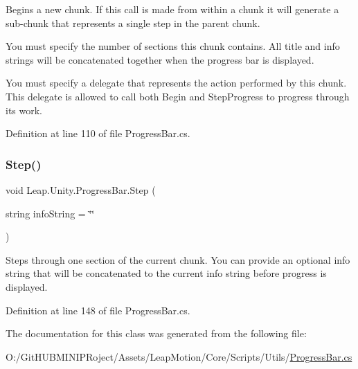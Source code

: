 Begins a new chunk. If this call is made from within a chunk it will generate a sub-\/chunk that represents a single step in the parent chunk. 

You must specify the number of sections this chunk contains. All title and info strings will be concatenated together when the progress bar is displayed.

You must specify a delegate that represents the action performed by this chunk. This delegate is allowed to call both Begin and Step\+Progress to progress through its work. 

Definition at line 110 of file Progress\+Bar.\+cs.

\mbox{\label{class_leap_1_1_unity_1_1_progress_bar_aa59a69d7baf972994660394378c9e3a9}} 
\subsubsection{\texorpdfstring{Step()}{Step()}}
{\footnotesize\ttfamily void Leap.\+Unity.\+Progress\+Bar.\+Step (\begin{DoxyParamCaption}\item[{string}]{info\+String = {\ttfamily \char`\"{}\char`\"{}} }\end{DoxyParamCaption})}



Steps through one section of the current chunk. You can provide an optional info string that will be concatenated to the current info string before progress is displayed. 



Definition at line 148 of file Progress\+Bar.\+cs.



The documentation for this class was generated from the following file\+:\begin{DoxyCompactItemize}
\item 
O\+:/\+Git\+H\+U\+B\+M\+I\+N\+I\+P\+Roject/\+Assets/\+Leap\+Motion/\+Core/\+Scripts/\+Utils/\mbox{\hyperlink{_progress_bar_8cs}{Progress\+Bar.\+cs}}\end{DoxyCompactItemize}
